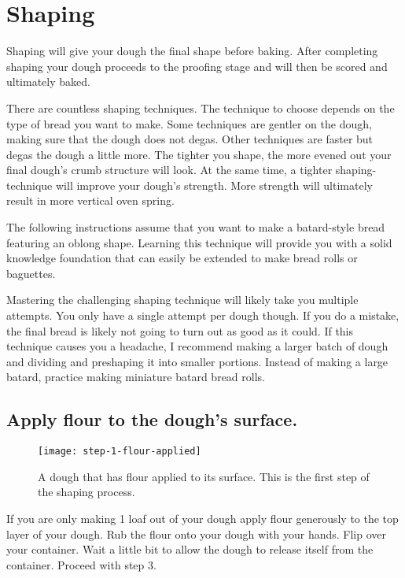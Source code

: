 \section{Shaping}

Shaping will give your dough the final shape before baking. After
completing shaping your dough proceeds to the proofing stage and
will then be scored and ultimately baked.

There are countless shaping techniques. The technique to choose
depends on the type of bread you want to make. Some techniques
are gentler on the dough, making sure that the dough does not
degas. Other techniques are faster but degas the dough a little
more. The tighter you shape, the more evened out your final dough's
crumb structure will look. At the same time, a tighter shaping-technique
will improve your dough's strength. More strength will ultimately result
in more vertical oven spring.

The following instructions assume that you want to make a batard-style
bread featuring an oblong shape. Learning this technique
will provide you with a solid knowledge foundation that
can easily be extended to make bread rolls or baguettes.

Mastering the challenging shaping technique will likely take you
multiple attempts. You only have a single attempt per dough though. If you
do a mistake, the final bread is likely not going to turn out as good
as it could. If this technique causes you a headache, I recommend making
a larger batch of dough and dividing and preshaping it into
smaller portions. Instead of making a large batard, practice making miniature
batard bread rolls.

\subsection[Flouring the surface]{Apply flour to the dough's surface.}

\begin{figure}[!htb]
  \texttt{[image: step-1-flour-applied]}
  \caption{A dough that has flour applied to its surface. This is
  the first step of the shaping process.}
  \label{fig:shaping-flour-surface}
\end{figure}

If you are only making 1 loaf out of your dough apply flour
generously to the top layer of your dough. Rub the flour onto your
dough with your hands. Flip over your container. Wait a little bit
to allow the dough to release itself from the container. Proceed
with step 3.


